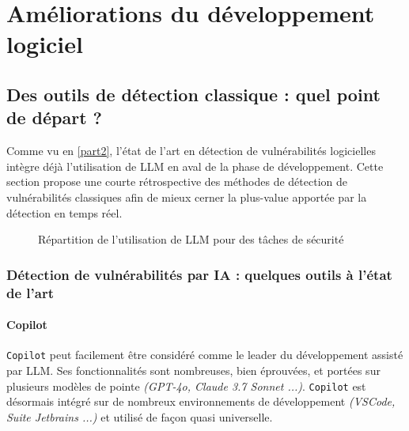 \chapter{Améliorations du développement logiciel}
    \section{Des outils de détection classique : quel point de départ ?}
        Comme vu en \ref{part2}, l'état de l'art en détection de vulnérabilités logicielles
        intègre déjà l'utilisation de LLM en aval de la phase de développement. Cette section
        propose une courte rétrospective des méthodes de détection de vulnérabilités classiques
        afin de mieux cerner la plus-value apportée par la détection en temps réel.
                \begin{figure}[H]
                    \centering
                    {}
                    \caption{Répartition de l'utilisation de LLM pour des tâches de sécurité\cite{citing4}}
                \end{figure}
        \newpage\subsection{Détection de vulnérabilités par IA : quelques outils à l'état de l'art}
            \subsubsection{Copilot}
                \texttt{Copilot} peut facilement être considéré comme le leader du développement
                assisté par LLM. Ses fonctionnalités sont nombreuses, bien éprouvées, et portées
                sur plusieurs modèles de pointe \textit{(GPT-4o, Claude 3.7 Sonnet ...)}.
                \texttt{Copilot} est désormais intégré sur de nombreux environnements de
                développement \textit{(VSCode, Suite Jetbrains ...)} et utilisé de façon quasi universelle.

